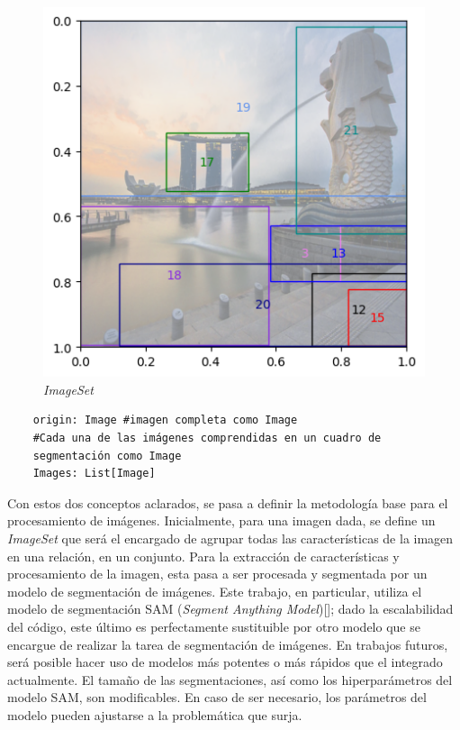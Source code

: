\begin{figure}[H]
    \centering
    \includegraphics[height=0.3\textheight]{Graphics/ImageSetExample.png}
    \caption{\textit{ImageSet}}
    \label{fig:imageset_example}
\end{figure}
\begin{verbatim}
    origin: Image #imagen completa como Image    
    #Cada una de las imágenes comprendidas en un cuadro de 
    segmentación como Image
    Images: List[Image]     
\end{verbatim}


Con estos dos conceptos aclarados, se pasa a definir la metodología base para el procesamiento de imágenes. Inicialmente, para una imagen dada, se define un \textit{ImageSet} que será el encargado de agrupar todas las características de la imagen en una relación, en un conjunto. Para la extracción de características y procesamiento de la imagen, esta pasa a ser procesada y segmentada por un modelo de segmentaci\'on de im\'agenes. Este trabajo, en particular, utiliza el modelo de segmentación SAM (\textit{Segment Anything Model})[\cite{huggingface2022sam}]; dado la escalabilidad del código, este \'ultimo es perfectamente sustituible por otro modelo que se encargue de realizar la tarea de segmentaci\'on de imágenes. En trabajos futuros, ser\'a posible hacer uso de modelos más potentes o más rápidos que el integrado actualmente. El tamaño de las segmentaciones, así como los hiperparámetros del modelo SAM, son modificables. En caso de ser necesario, los par\'ametros del modelo pueden ajustarse a la problem\'atica que surja.

